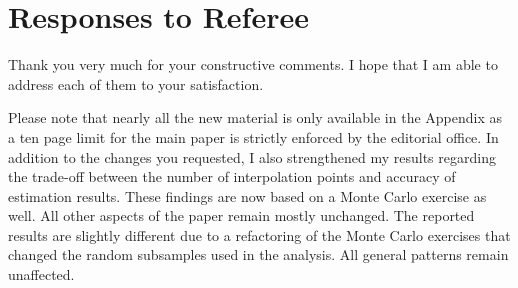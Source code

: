\newpage\section*{Responses to Referee}\vspace{1.0cm}
Thank you very much for your constructive comments. I hope that I am able to address each of them to your satisfaction.\\\newline

Please note that nearly all the new material is only available in the Appendix as a ten page limit for the main paper is strictly enforced by the editorial office. In addition to the changes you requested, I also strengthened my results regarding the trade-off between the number of interpolation points and accuracy of estimation results. These findings are now based on a Monte Carlo exercise as well. All other aspects of the paper remain mostly unchanged. The reported results are slightly different due to a refactoring of the Monte Carlo exercises that changed the random subsamples used in the analysis. All general patterns remain unaffected.

